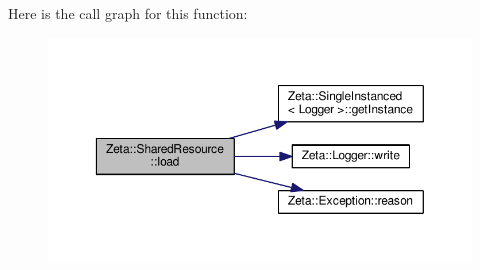 Here is the call graph for this function\+:\nopagebreak
\begin{figure}[H]
\begin{center}
\leavevmode
\includegraphics[width=350pt]{classZeta_1_1SharedResource_ad1e168b140359bfb79be98f81af9e19e_cgraph}
\end{center}
\end{figure}


